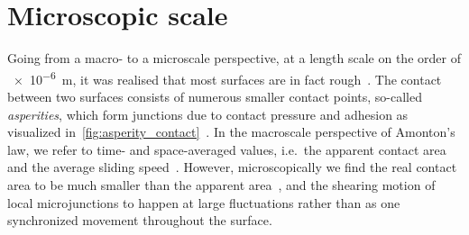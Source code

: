 










\section{Microscopic scale}\label{sec:microscale}
Going from a macro- to a microscale perspective, at a length scale on the order of
\SI{e-6}{m}, it was realised that most surfaces are in fact rough~\cite{mo_friction_2009}. The contact between two surfaces consists of numerous
smaller contact points, so-called \textit{asperities}, which form junctions due to contact pressure and adhesion as visualized in~\cref{fig:asperity_contact}~\cite{kim_nano-scale_2009}. In the macroscale perspective of Amonton's law, we refer to time- and space-averaged values, i.e.\ the apparent contact area and the average
sliding speed~\cite{gao_frictional_2004}. However, microscopically we find the
real contact area to be much smaller than the apparent area~\cite{kim_nano-scale_2009}, and the shearing motion of local microjunctions to happen at large fluctuations rather than as one synchronized movement throughout the surface. 

